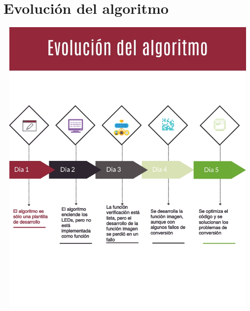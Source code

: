 \documentclass{article}
\begin{document}
\section{Evolución del algoritmo} \label{contenido}
\includegraphics[width=15cm, height=15cm]{Evolucion.jpg}
\end{document}

